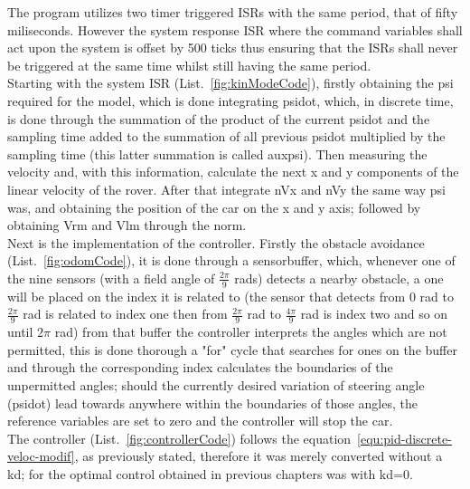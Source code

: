 The program utilizes two timer triggered ISRs with the same period, that of fifty miliseconds. However the system response ISR where the command variables shall act upon the system is offset by 500 ticks thus ensuring that the ISRs shall never be triggered at the same time whilst still having the same period. \\
Starting with the system ISR (List.~\ref{fig:kinModeCode}), firstly obtaining the psi required for the model, which is done integrating psidot, which, in discrete time, is done through the summation of the product of the current psidot and the sampling time added to the summation of all previous psidot multiplied by the sampling time (this latter summation is called aux\textunderscore psi). Then measuring the velocity and, with this information, calculate the next x and y components of the linear velocity of the rover. After that integrate nVx and nVy the same way psi was, and obtaining the position of the car on the x and y axis; followed by obtaining Vr\textunderscore m and Vl\textunderscore m through the norm.\\

Next is the implementation of the controller. Firstly the obstacle avoidance (List.~\ref{fig:odomCode}), it is done through a sensor\textunderscore buffer, which, whenever one of the nine sensors (with a field angle of $\frac{2\pi}{9}$ rads) detects a nearby obstacle, a one will be placed on the index it is related to (the sensor that detects from 0 rad to  $\frac{2\pi}{9}$ rad is related to index one then from $\frac{2\pi}{9}$ rad to $\frac{4\pi}{9}$ rad is index two and so on until $2\pi$ rad) from that buffer the controller interprets the angles which are not permitted, this is done thorough a "for" cycle that searches for ones on the buffer and through the corresponding index calculates the boundaries of the unpermitted angles; should the currently desired variation of steering angle (psidot) lead towards anywhere within the boundaries of those angles, the reference variables are set to zero and the controller will stop the car.\\

The controller (List.~\ref{fig:controllerCode}) follows the equation~\ref{equ:pid-discrete-veloc-modif}, as previously stated, therefore it was merely converted without a kd; for the optimal control obtained in previous chapters was with kd=0.\\
